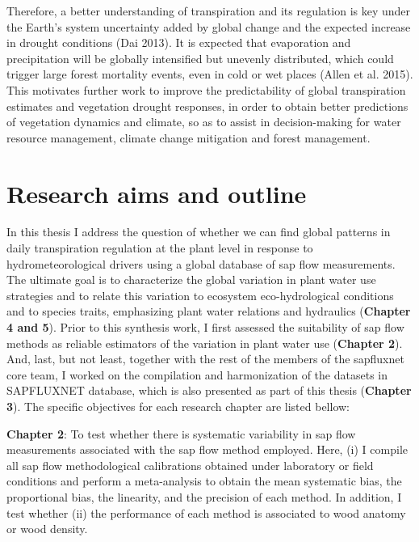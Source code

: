 \documentclass[11pt,twoside]{reedthesis}
\begin{document}
Therefore, a better understanding of transpiration and its regulation is
key under the Earth's system uncertainty added by global change and the
expected increase in drought conditions (Dai 2013). It is expected that
evaporation and precipitation will be globally intensified but unevenly
distributed, which could trigger large forest mortality events, even in
cold or wet places (Allen et al. 2015). This motivates further work to
improve the predictability of global transpiration estimates and
vegetation drought responses, in order to obtain better predictions of
vegetation dynamics and climate, so as to assist in decision-making for
water resource management, climate change mitigation and forest
management.\par

\section{Research aims and outline}\label{research-aims-and-outline}

In this thesis I address the question of whether we can find global
patterns in daily transpiration regulation at the plant level in
response to hydrometeorological drivers using a global database of sap
flow measurements. The ultimate goal is to characterize the global
variation in plant water use strategies and to relate this variation to
ecosystem eco-hydrological conditions and to species traits, emphasizing
plant water relations and hydraulics (\textbf{Chapter 4 and 5}). Prior
to this synthesis work, I first assessed the suitability of sap flow
methods as reliable estimators of the variation in plant water use
(\textbf{Chapter 2}). And, last, but not least, together with the rest
of the members of the sapfluxnet core team, I worked on the compilation
and harmonization of the datasets in SAPFLUXNET database, which is also
presented as part of this thesis (\textbf{Chapter 3}). The specific
objectives for each research chapter are listed bellow:\par

\textbf{Chapter 2}: To test whether there is systematic variability in
sap flow measurements associated with the sap flow method employed.
Here, (i) I compile all sap flow methodological calibrations obtained
under laboratory or field conditions and perform a meta-analysis to
obtain the mean systematic bias, the proportional bias, the linearity,
and the precision of each method. In addition, I test whether (ii) the
performance of each method is associated to wood anatomy or wood
density.\par
\end{document}
